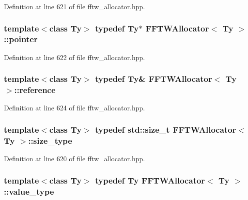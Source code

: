 Definition at line 621 of file fftw\-\_\-allocator.\-hpp.

\hypertarget{class_f_f_t_w_allocator_ac868161c4c2d0193981575f2b9544208}{
\subsubsection[{pointer}]{\setlength{\rightskip}{0pt plus 5cm}template$<$class Ty$>$ typedef Ty$\ast$ {\bf F\-F\-T\-W\-Allocator}$<$ Ty $>$\-::{\bf pointer}}}\label{class_f_f_t_w_allocator_ac868161c4c2d0193981575f2b9544208}


Definition at line 622 of file fftw\-\_\-allocator.\-hpp.

\hypertarget{class_f_f_t_w_allocator_a54261f01b9a1fcd6608f9129f969387d}{
\subsubsection[{reference}]{\setlength{\rightskip}{0pt plus 5cm}template$<$class Ty$>$ typedef Ty\& {\bf F\-F\-T\-W\-Allocator}$<$ Ty $>$\-::{\bf reference}}}\label{class_f_f_t_w_allocator_a54261f01b9a1fcd6608f9129f969387d}


Definition at line 624 of file fftw\-\_\-allocator.\-hpp.

\hypertarget{class_f_f_t_w_allocator_a74c8fd5a39d426623d89320b57195bdd}{
\subsubsection[{size\-\_\-type}]{\setlength{\rightskip}{0pt plus 5cm}template$<$class Ty$>$ typedef std\-::size\-\_\-t {\bf F\-F\-T\-W\-Allocator}$<$ Ty $>$\-::{\bf size\-\_\-type}}}\label{class_f_f_t_w_allocator_a74c8fd5a39d426623d89320b57195bdd}


Definition at line 620 of file fftw\-\_\-allocator.\-hpp.

\hypertarget{class_f_f_t_w_allocator_af48e61e5c4fce705af675694acb3518e}{
\subsubsection[{value\-\_\-type}]{\setlength{\rightskip}{0pt plus 5cm}template$<$class Ty$>$ typedef Ty {\bf F\-F\-T\-W\-Allocator}$<$ Ty $>$\-::{\bf value\-\_\-type}}}\label{class_f_f_t_w_allocator_af48e61e5c4fce705af675694acb3518e}


